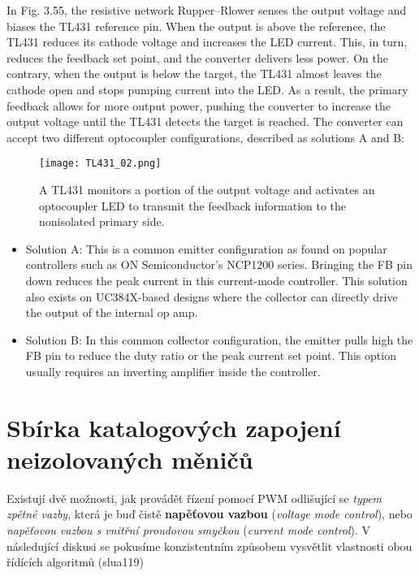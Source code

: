 {      In Fig. 3.55, the resistive network Rupper–Rlower senses the output voltage and biases the 
      TL431 reference pin. When the output is above the reference, the TL431 reduces its cathode 
      voltage and increases the LED current. This, in turn, reduces the feedback set point, and the 
      converter delivers less power. On the contrary, when the output is below the target, the 
      TL431 almost leaves the cathode open and stops pumping current into the LED. As a result, the 
      primary feedback allows for more output power, pushing the converter to increase the output 
      voltage until the TL431 detects the target is reached. The converter can accept two different 
      optocoupler configurations, described as solutions A and B:
      
      \begin{figure}[ht!]
        \centering
        \texttt{[image: TL431\_02.png]}
        \caption{A TL431 monitors a portion of the output voltage and activates an optocoupler LED 
                 to transmit the feedback information to the nonisolated primary side. 
                 \cite[s.~43]{Basso2008}}
        \label{enz:fig_tl431_02}
      \end{figure}
       
      \begin{itemize}\addtolength{\itemsep}{-0.5\baselineskip}
        \item Solution A: This is a common emitter configuration as found on popular controllers 
              such as ON Semiconductor’s NCP1200 series. Bringing the FB pin down reduces the peak 
              current in this current-mode controller. This solution also exists on UC384X-based 
              designs where the collector can directly drive the output of the internal op amp.
        \item Solution B: In this common collector configuration, the emitter pulls high the FB pin 
              to reduce the duty ratio or the peak current set point. This option usually requires 
              an inverting amplifier inside the controller.
      \end{itemize}
    

  \section{Sbírka katalogových zapojení neizolo\-va\-ných měničů}\label{aes:sec009}
    Existují dvě možnosti, jak provádět řízení pomocí PWM odlišující se \emph{typem zpětné
    vazby}, která je buď čistě \textbf{napěťovou vazbou} (\emph{voltage mode control}), nebo
    \emph{napěťovou vazbou s vnitřní proudovou smyčkou} (\emph{current mode control}). V
    následující diskusi se pokusíme konzistentním způsobem vysvětlit vlastnosti obou řídících
    algoritmů (slua119)
    
}
